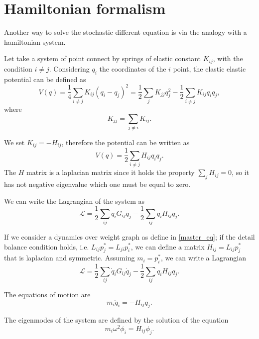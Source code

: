 \chapter{Hamiltonian formalism}
Another way to solve the stochastic different equation is via the analogy with a hamiltonian system.

Let take a system of point connect by springs of elastic constant $K_{ij}$, with the condition $i \neq j$. 
Considering $q_i$ the coordinates of the $i$ point, the elastic elastic potential can be defined as
\begin{equation}
    V(q) = \frac{1}{4}\sum_{i\neq j} K_{ij}(q_i-q_j)^2 = \frac{1}{2}\sum_{j}K_{jj}q_j^2 - \frac{1}{2} \sum_{i\neq j}K_{ij}q_iq_j,
\end{equation}
where 
\begin{equation}
    K_{jj} = \sum_{j \neq i} K_{ij}.
\end{equation}

We set $K_{ij}=-H_{ij}$, therefore the potential can be written as
\begin{equation}
    V(q) = \frac{1}{2}\sum_{i\neq j} H_{ij} q_i q_j.
\end{equation}
The $H$ matrix is a laplacian matrix since it holds the property $\sum_j H_{ij} = 0$, so it has not negative eigenvalue which one must be equal to zero. %

We can write the Lagrangian of the system as
\begin{equation}
    \mathcal{L} = \frac{1}{2}\sum_{ij} \dot q_i G_{ij} \dot q_j -\frac{1}{2} \sum_{ij} q_iH_{ij}q_j.
\end{equation}

If we consider a dynamics over weight graph as define in \ref{master_eq}; if the detail balance condition holds, i.e. $L_{ij}p_j^*=L_{ji} p_i^*$, we can define a matrix $H_{ij} = L_{ij}p_j^*$ that is laplacian and symmetric. Assuming $m_i = p_i^*$, we can write a Lagrangian 
\begin{equation}
    \mathcal{L} = \frac{1}{2}\sum_{ij} \dot q_i G_{ij} \dot q_j -\frac{1}{2} \sum_{ij} q_iH_{ij}q_j.
\end{equation}

The equations of motion are
\begin{equation}
    m_i \ddot q_i = -H_{ij} q_j.
\end{equation}

The eigenmodes of the system are defined by the solution of the equation 
\begin{equation}
    m_i \omega^2 \phi_i = H_{ij} \phi_j.
\end{equation}

